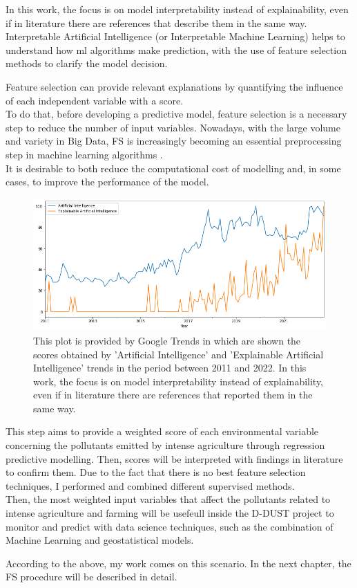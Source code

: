 In this work, the focus is on model interpretability instead of explainability, even if in literature there are references that describe them in the same way.
Interpretable Artificial Intelligence (or Interpretable Machine Learning) helps to understand how \acrshort{ml} algorithms make prediction, with the use of feature selection methods to clarify the model decision.\par
Feature selection can provide relevant explanations by quantifying the influence of each independent variable with a score.\\
To do that, before developing a predictive model, feature selection is a necessary step to reduce the number of input variables. \newline
Nowadays, with the large volume and variety in Big Data, FS is increasingly becoming an essential preprocessing step in machine learning algorithms \cite{kamolov2021feature}.\\
It is desirable to both reduce the computational cost of modelling and, in some cases, to improve the performance of the model.\newline
\begin{figure}[H]
    \includegraphics[scale=0.50]{images/AI_XAI.png}
    \caption{This plot is provided by Google Trends in which are shown the scores obtained by 'Artificial Intelligence' and 'Explainable Artificial Intelligence' trends in the period between 2011 and 2022. In this work, the focus is on model interpretability instead of explainability, even if in literature there are references that reported them in the same way.}
    \label{fig:AI_XAI}
\end{figure}
\bigbreak
This step aims to provide a weighted score of each environmental variable concerning the pollutants emitted by intense agriculture through regression predictive modelling. Then, scores will be interpreted with findings in literature to confirm them.
Due to the fact that there is no best feature selection techniques, I performed and combined different supervised methods. 
\\
Then, the most weighted input variables that affect the pollutants related to intense agriculture and farming will be usefeull inside the D-DUST project to monitor and predict with data science techniques, such as the combination of Machine Learning and geostatistical models.
\par
According to the above, my work comes on this scenario.
In the next chapter, the FS procedure will be described in detail.
